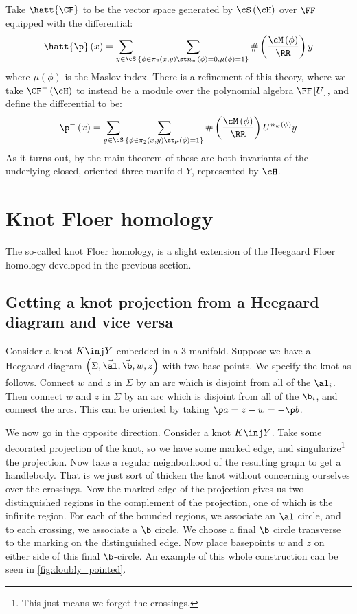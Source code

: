 \documentclass{amsproc}
\begin{document}
Take $\hatt{\CF}$ to be the vector space generated by $\cS\left( \cH \right)$ over
$\FF$ equipped with the differential:
\begin{equation}
\hatt{\p}\left( x \right) = 
\sum_{y\in \cS}
\sum_{\left\{ \phi \in \pi_2\left( x, y \right) \st 
n_w\left( \phi \right)= 0, \mu\left( \phi \right) = 1 \right\}}
\#\left( \frac{\cM\left( \phi \right)}{\RR} \right)y
\end{equation}
where $\mu\left( \phi \right)$ is the Maslov index.
There is a refinement of this theory, where we take $\CF^-\left( \cH \right)$ 
to instead be a module over the polynomial algebra $\FF\left[ U \right]$,
and define the differential to be:
\begin{equation}
\p^-\left( x \right)= \sum_{y\in \cS} \sum_{
\left\{ \phi \in \pi_2\left( x , y \right) \st \mu\left( \phi \right)= 1 \right\}}
\#\left( \frac{\cM\left( \phi \right)}{\RR} \right) U^{n_w\left( \phi \right)} y
\end{equation}
As it turns out, by the main theorem of \cite{oz_sz_three_manifolds}
these are both invariants of the underlying closed, oriented three-manifold $Y$, 
represented by $\cH$.



\section{Knot Floer homology}

The so-called knot Floer homology, 
is a slight extension of the Heegaard Floer homology
developed in the previous section.

\subsection{Getting a knot projection from a Heegaard diagram and vice versa}

Consider a knot $K\inj Y$ embedded in a $3$-manifold. 
Suppose we have a Heegaard diagram $\left( \Sigma , \vec{\al} , \vec{\b} , w , z \right)$
with two base-points. We specify the knot as follows. 
Connect $w$ and $z$ in $\Sigma$ by an arc which is disjoint from all of the $\al_i$. 
Then connect $w$ and $z$ in $\Sigma$ by an arc which is disjoint from all of the $\b_i$, 
and connect the arcs. This can be oriented by taking $\p a = z - w = - \p b$.

We now go in the opposite direction. Consider a knot $K\inj Y$. Take some decorated projection of the knot,
so we have some marked edge, 
and singularize\footnote{This just means we forget the crossings.} the projection.
Now take a regular neighborhood of the resulting graph to get a handlebody.
That is we just sort of thicken the knot without concerning ourselves over the crossings. 
Now the marked edge of the projection gives us two distinguished regions in the 
complement of the projection, one of which is the infinite region.
For each of the bounded regions, we associate an $\al$ circle, and to each
crossing, we associate a $\b$ circle. We choose a final $\b$ circle transverse to the 
marking on the distinguished edge. Now place basepoints $w$ and $z$ on either side of this
final $\b$-circle.
An example of this whole construction can be seen in \cref{fig:doubly_pointed}.
\end{document}

